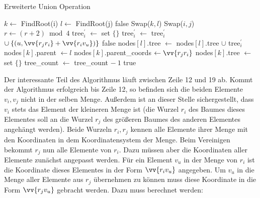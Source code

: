 \documentclass{whswinvcbook}
\begin{document}
\begin{algorithm}[H]
    \caption{Erweiterte Union Operation}\label{alg-dsf-union2}
    \begin{algorithmic}[1]
            \State $k\gets$ FindRoot(i)
            \State $l\gets$ FindRoot(j)
                \State \Return false
            \EndIf
                \State Swap($k,l$)
                \State Swap($i,j$)
                \State $r\gets(r+2)\bmod4$
            \EndIf
            \State tree$_i^\prime$ $\gets$ set $\{\}$
                \State tree$_i^\prime$ $\gets$ tree$_i^\prime$ $\cup\:\{(u,\vv{r_j r_i}+\vv{r_i v_u})\}$
            \EndFor
                \State \Return false
            \EndIf
            \State nodes$[l]$.tree $\gets$ nodes$[l]$.tree $\cup$ tree$_i^\prime$
            \State nodes$[k]$.parent $\gets l$
            \State nodes$[k]$.parent\_coords $\gets\vv{r_j r_i}$
            \State nodes$[k]$.tree $\gets$ set $\{\}$
            \State tree\_count $\gets$ tree\_count $-\:1$
            \State \Return true
        \EndFunction
    \end{algorithmic}
\end{algorithm}
Der interessante Teil des Algorithmus läuft zwischen Zeile 12 und 19 ab. Kommt der Algorithmus erfolgreich bis Zeile 12, so befinden sich die beiden Elemente $v_i,v_j$ nicht in der selben Menge. Außerdem ist an dieser Stelle sichergestellt, dass $v_i$ stets das Element der kleineren Menge ist (die Wurzel $r_i$ des Baumes dieses Elementes soll an die Wurzel $r_j$ des größeren Baumes des anderen Elementes angehängt werden). Beide Wurzeln $r_i,r_j$ kennen alle Elemente ihrer Menge mit den Koordinaten in dem Koordinatensystem der Menge. Beim Vereinigen bekommt $r_j$ nun alle Elemente von $r_i$. Dazu müssen aber die Koordinaten aller Elemente zunächst angepasst werden. Für ein Element $v_u$ in der Menge von $r_i$ ist die Koordinate dieses Elementes in der Form $\vv{r_i v_u}$ angegeben. Um $v_u$ in die Menge aller Elemente aus $r_j$ übernehmen zu können muss diese Koordinate in die Form $\vv{r_j v_u}$ gebracht werden. Dazu muss berechnet werden:
\end{document}
